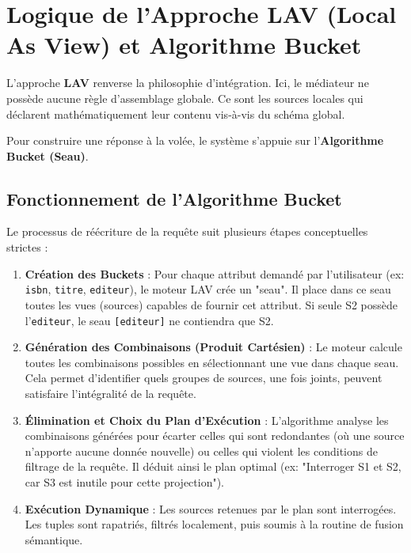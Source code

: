 \documentclass[12pt,a4paper]{article}
\begin{document}
\section{Logique de l'Approche LAV (Local As View) et Algorithme Bucket}

L'approche \textbf{LAV} renverse la philosophie d'intégration. Ici, le médiateur ne possède aucune règle d'assemblage globale. Ce sont les sources locales qui déclarent mathématiquement leur contenu vis-à-vis du schéma global. 

Pour construire une réponse à la volée, le système s'appuie sur l'\textbf{Algorithme Bucket (Seau)}.

\subsection{Fonctionnement de l'Algorithme Bucket}
Le processus de réécriture de la requête suit plusieurs étapes conceptuelles strictes :

\begin{enumerate}
    \item \textbf{Création des Buckets} : 
    Pour chaque attribut demandé par l'utilisateur (ex: \texttt{isbn}, \texttt{titre}, \texttt{editeur}), le moteur LAV crée un "seau". Il place dans ce seau toutes les vues (sources) capables de fournir cet attribut. Si seule S2 possède l'\texttt{editeur}, le seau \texttt{[editeur]} ne contiendra que S2.
    
    \item \textbf{Génération des Combinaisons (Produit Cartésien)} :
    Le moteur calcule toutes les combinaisons possibles en sélectionnant une vue dans chaque seau. Cela permet d'identifier quels groupes de sources, une fois joints, peuvent satisfaire l'intégralité de la requête.
    
    \item \textbf{Élimination et Choix du Plan d'Exécution} :
    L'algorithme analyse les combinaisons générées pour écarter celles qui sont redondantes (où une source n'apporte aucune donnée nouvelle) ou celles qui violent les conditions de filtrage de la requête. Il déduit ainsi le plan optimal (ex: "Interroger S1 et S2, car S3 est inutile pour cette projection").
    
    \item \textbf{Exécution Dynamique} :
    Les sources retenues par le plan sont interrogées. Les tuples sont rapatriés, filtrés localement, puis soumis à la routine de fusion sémantique.
\end{enumerate}
\end{document}
